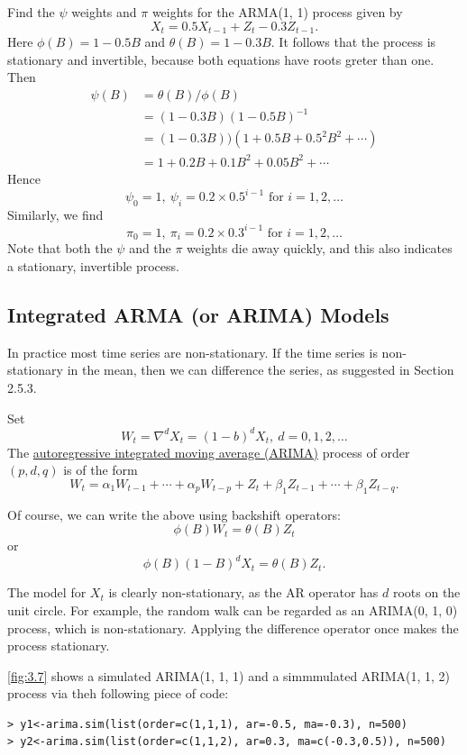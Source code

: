 \begin{example}[]
Find the $\psi$ weights and $\pi$ weights for the ARMA(1, 1) process given by 
\[ X_t = 0.5X_{t-1} + Z_t - 0.3Z_{t-1}. \]
Here $\phi(B) = 1 - 0.5B$ and $\theta(B) = 1 - 0.3B$. It follows that the process is stationary and invertible, 
because both equations have roots greter than one. Then 
\begin{align*}
	\psi(B)
	&= \theta(B) / \phi(B) \\
	&= (1 - 0.3B) (1 - 0.5B)^{-1} \\
	&= (1 - 0.3B))(1 + 0.5B + 0.5^2 B^2 + \cdots) \\
	&= 1 + 0.2B + 0.1B^2 + 0.05B^2 + \cdots
\end{align*}
Hence 
\[ \psi_0 = 1, \ \psi_i = 0.2 \times 0.5^{i - 1} \text{ for } i = 1, 2, \dots \]
Similarly, we find 
\[ \pi_0 = 1, \ \pi_i = 0.2 \times 0.3^{i - 1} \text{ for } i = 1, 2, \dots \]
Note that both the $\psi$ and the $\pi$ weights die away quickly, and this also indicates a stationary, 
invertible process.
\end{example}



\subsection{Integrated ARMA (or ARIMA) Models}
In practice most time series are non-stationary. If the time series is non-stationary in the mean, then we can 
difference the series, as suggested in Section 2.5.3. 

\begin{definition*}[]
Set 
\[ W_t = \nabla^d X_t = (1 - b)^d X_t, \ d = 0, 1, 2, \dots \]
The \underline{autoregressive integrated moving average (ARIMA)} process of order $(p,d,q)$ is of the form
\[ W_t = \alpha_1 W_{t-1} + \cdots + \alpha_pW_{t-p} + Z_t + \beta_1Z_{t-1} + \cdots + \beta_1 Z_{t-q}. \]
\end{definition*}

Of course, we can write the above using backshift operators:
\[ \phi(B) W_t = \theta(B) Z_t \]
or 
\[ \phi(B)(1 - B)^d X_t = \theta(B) Z_t. \]

The model for $X_t$ is clearly non-stationary, as the AR operator has $d$ roots on the unit circle. For example, 
the random walk can be regarded as an ARIMA(0, 1, 0) process, which is non-stationary. Applying the difference 
operator once makes the process stationary.

\cref{fig:3.7} shows a simulated ARIMA(1, 1, 1) and a simmmulated ARIMA(1, 1, 2) process via theh following 
piece of code:
\begin{verbatim}
> y1<-arima.sim(list(order=c(1,1,1), ar=-0.5, ma=-0.3), n=500)
> y2<-arima.sim(list(order=c(1,1,2), ar=0.3, ma=c(-0.3,0.5)), n=500)
\end{verbatim}

